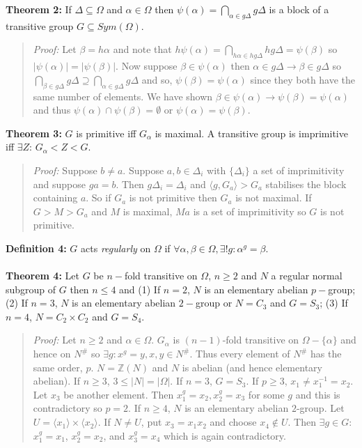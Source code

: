 {\bf Theorem 2:}
If $\Delta \subseteq \Omega$ and $\alpha \in \Omega$ then 
$\psi( \alpha ) = \bigcap_{\alpha \in g \Delta} g \Delta$ is a block of a transitive
group $G \subseteq Sym(\Omega)$.
\begin{quote}
\emph{Proof:}  
Let $\beta= h \alpha$ and
note that 
$h \psi( \alpha ) = \bigcap_{h \alpha \in hg \Delta} hg \Delta= \psi( \beta )$ so
$ |\psi( \alpha )|= |\psi( \beta )| $.   Now suppose $\beta \in \psi( \alpha )$ then
$\alpha \in g \Delta \rightarrow \beta \in g \Delta$ so 
$\bigcap_{\beta \in g \Delta} g \Delta \supseteq \bigcap_{\alpha \in g \Delta} g \Delta$ and
so, $\psi( \beta ) = \psi ( \alpha )$ since they both have the same number of elements.  We have
shown $\beta \in \psi( \alpha ) \rightarrow  \psi( \beta ) = \psi( \alpha )$ and thus
$\psi( \alpha ) \cap \psi( \beta ) = \emptyset$  or 
$\psi( \alpha ) = \psi( \beta )$.
\end{quote}
{\bf Theorem 3:}
$G$ is primitive iff $G_{\alpha}$ is maximal.
A transitive group is imprimitive iff $\exists Z$: $G_{\alpha} < Z < G$.
\begin{quote}
\emph{Proof:}  
Suppose $b \ne a$.  Suppose $a, b \in \Delta_i$ with $\{ \Delta_i \}$ a set of
imprimitivity and suppose $g a= b$.  Then $g \Delta_i = \Delta_i$ and 
$ \langle g, G_a \rangle > G_a$
stabilises the block containing $a$.  So if $G_a$ is not primitive then $G_a$ is not maximal.
If $G > M > G_a$ and $M$ is maximal, $Ma$ is a set of imprimitivity so $G$ is not primitive.
\end{quote}
{\bf Definition 4:}
$G$ acts \emph{regularly} on $\Omega$ if $\forall \alpha, \beta \in \Omega,
\exists ! g: \alpha^g= \beta$.  
\\
\\
{\bf Theorem 4:}  Let $G$ be $n-$fold transitive on $\Omega$, $n \ge 2$ and $N$ a regular
normal subgroup of $G$ then $n \le 4$ and 
(1) If $n=2$, $N$ is an elementary abelian $p-$group; 
(2) If $n=3$, $N$ is an elementary abelian $2-$group or $N=C_3$ and $G=S_3$;
(3) If $n=4$, $N= C_2 \times C_2$ and $G=S_4$.
\begin{quote}
\emph{Proof:}  
Let $n \geq 2$ and $\alpha \in \Omega$.  $G_{\alpha}$ is $(n-1)$-fold transitive on $\Omega - \{ \alpha \}$ and
hence on $N^{\#}$ so $\exists g: x^g=y, x,y \in N^{\#}$.  Thus every element of $N^{\#}$ has the same order, $p$.
$N= {\mathbb Z}(N)$ and $N$ is abelian (and hence elementary abelian).
If $n \geq 3$, $3 \leq |N|=|\Omega|$.  If $n=3$, $G=S_3$.  If $p \geq 3$, $x_1 \neq x_1^{-1}=x_2$.  Let $x_3$ be another 
element.  Then $x_1^g= x_2, x_2^g=x_3$ for some $g$ and this is contradictory so $p=2$.
If $n \geq 4$, $N$ is an elementary abelian $2$-group.  Let $U= \langle x_1 \rangle \times \langle x_2 \rangle$.
If $N \neq U$, put $x_3=x_1 x_2$ and choose $x_4 \notin U$.  Then $\exists g \in G:$
$x_1^g= x_1$,
$x_2^g= x_2$, and
$x_3^g= x_4$ which is again contradictory.
\end{quote}
